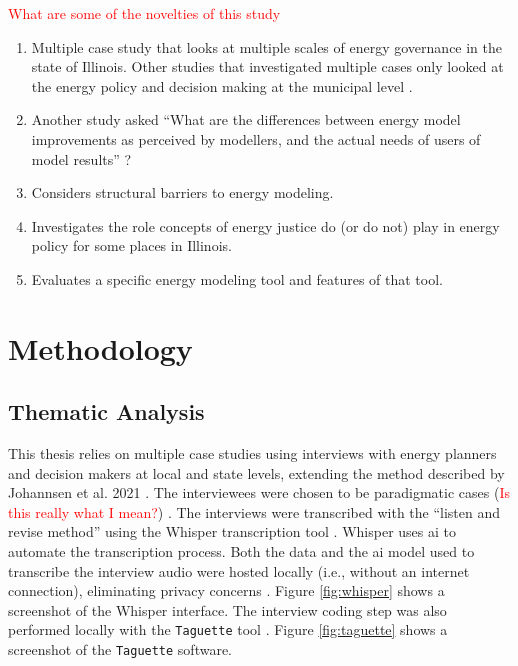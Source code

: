 \textcolor{red}{What are some of the novelties of this study}
\begin{enumerate}
    \item Multiple case study that looks at multiple scales of energy governance
    in the state of Illinois. Other studies that investigated multiple cases
    only looked at the energy policy and decision making at the municipal level
    \cite{johannsen_designing_2021, ben_amer_too_2020}.
    \item Another study asked ``What are the differences between energy model
    improvements as perceived by modellers, and the actual needs of users of
    model results'' \cite{susser_better_2022}?
    \item Considers structural barriers to energy modeling.
    \item Investigates the role concepts of energy justice do (or do not) play
    in energy policy for some places in Illinois.
    \item Evaluates a specific energy modeling tool and features of that tool.
\end{enumerate}

\section{Methodology}
\label{section:interview-methods}

\subsection{Thematic Analysis}
This thesis relies on multiple case studies using interviews with energy
planners and decision makers at local and state levels, extending the method
described by Johannsen et al. 2021 \cite{johannsen_designing_2021}. The
interviewees were chosen to be paradigmatic cases (\textcolor{red}{Is this
really what I mean?}) \cite{flyvbjerg_five_2006}. The interviews were
transcribed with the ``listen and revise method'' using the Whisper
transcription tool \cite{battaglia_listen_2024}. Whisper uses \ac{ai} to
automate the transcription process. Both the data and the \ac{ai} model used to
transcribe the interview audio were hosted locally (i.e., without an internet
connection), eliminating privacy concerns \cite{battaglia_listen_2024}. Figure
\ref{fig:whisper} shows a screenshot of the Whisper interface. The interview
coding step was also performed locally with the \texttt{Taguette} tool
\cite{rampin_taguette_2021}. Figure \ref{fig:taguette} shows a screenshot of the
\texttt{Taguette} software.

